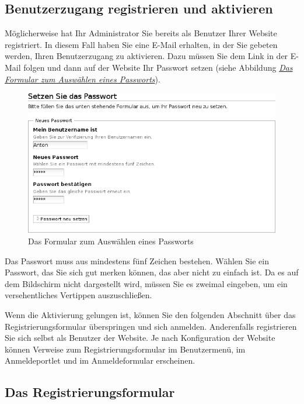 \documentclass[a4paper,12pt,ngerman]{manual}
\begin{document}
\subsection{Benutzerzugang registrieren und aktivieren}

Möglicherweise hat Ihr Administrator Sie bereits als Benutzer Ihrer Website
registriert. In diesem Fall haben Sie eine E-Mail erhalten, in der
Sie gebeten werden, Ihren Benutzerzugang zu aktivieren. Dazu müssen Sie dem
Link in der E-Mail folgen und dann auf der Website Ihr Passwort setzen
(siehe Abbildung \hyperlink{fig-passwortsetzen}{\emph{Das Formular zum Auswählen eines Passworts}}).
\hypertarget{fig-passwortsetzen}{}\begin{figure}[htbp]
\centering

\includegraphics[width=0.700\linewidth]{passwortsetzen.png}
\caption{Das Formular zum Auswählen eines Passworts}\end{figure}

Das Passwort muss aus mindestens fünf Zeichen bestehen. Wählen Sie ein
Passwort, das Sie sich gut merken können, das aber nicht zu einfach ist. Da
es auf dem Bildschirm nicht dargestellt wird, müssen Sie es zweimal eingeben,
um ein versehentliches Vertippen auszuschließen.

Wenn die Aktivierung gelungen ist, können Sie den folgenden Abschnitt über das
Registrierungsformular überspringen und sich anmelden.
Anderenfalls registrieren Sie sich selbst als Benutzer der Website. Je nach
Konfiguration der Website können Verweise zum Registrierungsformular im
Benutzermenü, im Anmeldeportlet und im Anmeldeformular erscheinen.
\hypertarget{sec-benutz-registr-und-1}{}

\subsection{Das Registrierungsformular}
\end{document}
